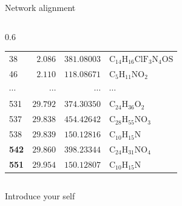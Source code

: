 \documentclass[aspectratio=169]{beamer}
\newcommand{\source}[1]{\par\tiny Source: #1} %
\renewcommand{\alert}[1]{\textbf{\color{swufe}#1}}
\begin{document}
\begin{frame}{Network alignment}
\begin{columns}[t]
\begin{column}{0.6\textwidth}
\begin{table}[htp!]
\begin{tabular}{lrrl}
                        38	& $2.086$	& $381.08003$ & $\mathrm{C_{14}H_{16}ClF_{3}N_{4}OS}$ \\
                        46 & $2.110$	& $118.08671$	& $\mathrm{C_{5}H_{11}NO_{2}}$ \\
                        $\cdots$ & $\cdots$ & $\cdots$ & $\cdots$ \\
                        531	& $29.792$	& $374.30350$ & $\mathrm{C_{24}H_{36}O_{2}}$ \\
                        537	& $29.838$	& $454.42642$ & $\mathrm{C_{28}H_{55}NO_{3}}$ \\
                        538	& $29.839$	& $150.12816$ & $\mathrm{C_{10}H_{15}N}$ \\
                        \alert{542}	& $29.860$	& $398.23344$ & $\mathrm{C_{24}H_{31}NO_{4}}$ \\
                        \alert{551}	& $29.954$	& $150.12807$ & $\mathrm{C_{10}H_{15}N}$ \\\bottomrule
                    \end{tabular}
                \end{table}
            \end{column}
        \end{columns}

        \begin{note}
            {Introduce your self}
        \end{note}
    \end{frame}


\end{document}

